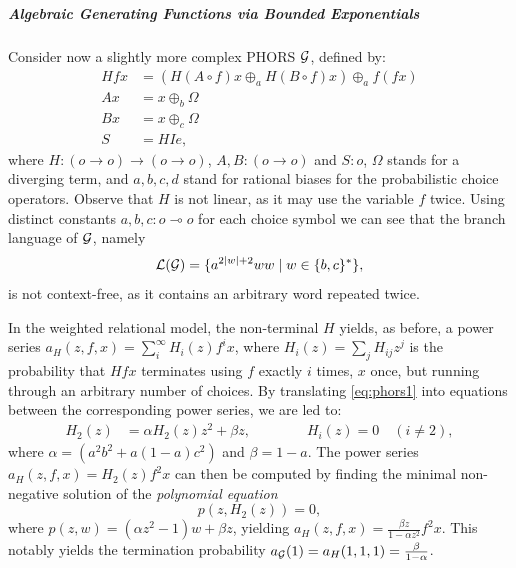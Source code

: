 \subparagraph*{Algebraic Generating Functions via Bounded Exponentials}

Consider now a slightly more complex PHORS $\mathcal{G}$, defined by:
\begin{equation}\label{eq:phors1}
\begin{aligned}
Hfx&=( H(A\circ f)x \oplus_{a}
H(B\circ f)x )\oplus_{a}f(fx)\\
Ax&= x\oplus_{b} \Omega\\
Bx&=x\oplus_{c} \Omega\\
S&=HIe,
\end{aligned}
\end{equation}
where $H:(o\to o)\to (o\to o)$, $A,B:(o\to o)$ and $S:o$, $\Omega$ stands for a diverging term, 
and $a,b,c,d$ stand for rational biases for the probabilistic choice operators. Observe that $H$ is not linear, as it may use the variable $f$ twice.
Using distinct constants $a,b,c:o\multimap o$ for each choice symbol we can see that the branch language of $\mathcal{G}$, namely
$$
\mathcal L(\mathcal{G})=\{ a^{2|w|+2}ww\mid w\in \{b,c\}^*\},
$$
is not context-free, as it contains an arbitrary word repeated twice.

In the weighted relational model, the non-terminal $H$ yields, as before, a power series $a_{H}(z,f,x)=\sum_{i}^{\infty}H_{i}(z) f^{i} x$, where
$H_{i}(z)=\sum_j H_{ij}z^j$ is the probability that $Hfx$ terminates using $f$ exactly $i$ times, $x$ once, but running through an arbitrary number of choices.
By translating \eqref{eq:phors1} into equations between the corresponding power series, we are led to: 
\begin{equation}\label{eq:poly}
\begin{aligned}
H_{2}(z)&=
\alpha H_{2}(z)z^2  +\beta z, \qquad\qquad  H_{i}(z)=0 \quad (i\neq 2),
\end{aligned}
\end{equation}
where $\alpha=(a^2b^2+a(1-a)c^2)$ and $\beta=1-a$.
The power series 
$a_{H}(z,f,x)=H_2(z)f^2x$ can then be computed by finding the minimal non-negative solution of the \emph{polynomial equation}
\[
p(z,H_2(z))=0,
\]
where $p(z,w)= (\alpha z^2-1)w+\beta z$, yielding 
$a_{H}(z,f,x)= \frac{\beta z}{1-\alpha z^2}f^2x$. 
This notably yields the termination probability $a_{\mathcal{G}}(1)=
a_{H}(1,1,1)=
\frac{\beta }{1-\alpha }$.

